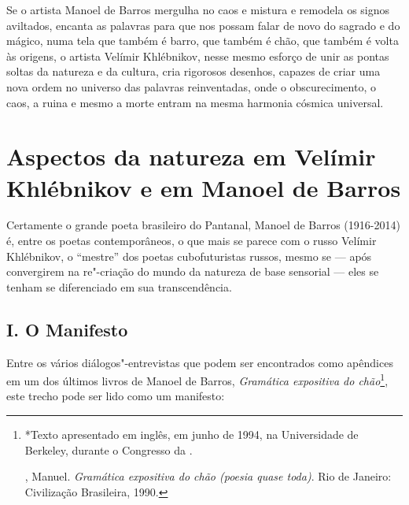 Se o artista Manoel de Barros mergulha no caos e mistura e remodela os
signos aviltados, encanta as palavras para que nos possam falar de novo
do sagrado e do mágico, numa tela que também é barro, que também é chão,
que também é volta às origens, o artista Velímir Khlébnikov, nesse mesmo
esforço de unir as pontas soltas da natureza e da cultura, cria
rigorosos desenhos, capazes de criar uma nova ordem no universo das
palavras reinventadas, onde o obscurecimento, o caos, a ruina e mesmo a
morte entram na mesma harmonia cósmica universal.

\chapter{Aspectos da natureza em Velímir Khlébnikov e em Manoel de Barros}

Certamente o grande poeta brasileiro do Pantanal, Manoel de Barros
(1916-2014) é, entre os poetas contemporâneos, o que mais se parece
com o russo Velímir Khlébnikov, o ``mestre'' dos poetas cubofuturistas
russos, mesmo se --- após convergirem na re"-criação do mundo da natureza
de base sensorial --- eles se tenham se diferenciado em sua
transcendência.

\section{I. O Manifesto}

Entre os vários diálogos"-entrevistas que podem ser encontrados como
apêndices em um dos últimos livros de Manoel de Barros, \emph{Gramática
expositiva do chão}\footnote{*Texto apresentado em inglês, em junho de
  1994, na Universidade de Berkeley, durante o Congresso da .

  , Manuel. \emph{Gramática expositiva do chão (poesia quase
  toda)}. Rio de Janeiro: Civilização Brasileira, 1990.}, este trecho
pode ser lido como um manifesto:

